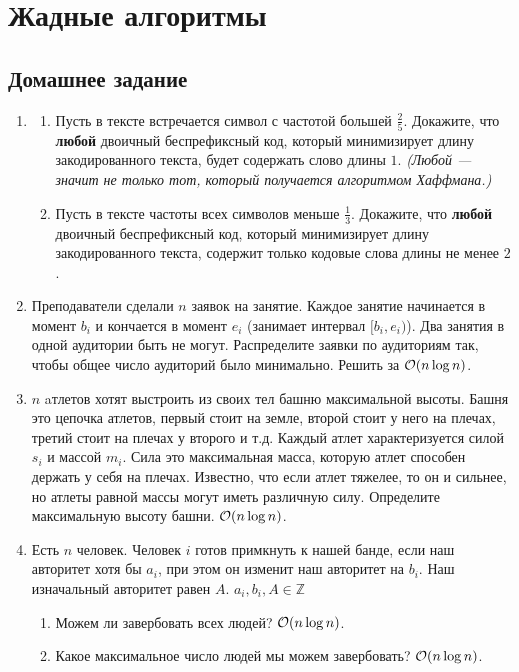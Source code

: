 \section{Жадные алгоритмы}

\subsection{Домашнее задание}
\begin{enumerate}
  \item
    \begin{enumerate}
      \item
        Пусть в тексте встречается символ с частотой большей $\frac{2}{5}$.
        Докажите, что \textbf{любой} двоичный беспрефиксный код, который минимизирует длину закодированного текста,
        будет содержать слово длины $1$. \textit{(Любой --- значит не только тот, который получается
        алгоритмом Хаффмана.)}

      \item
        Пусть в тексте частоты всех символов меньше $\frac{1}{3}$.
        Докажите, что \textbf{любой} двоичный беспрефиксный код, который минимизирует длину закодированного текста,
        содержит только кодовые слова длины не менее $2$.
    \end{enumerate}

  \item
 	Преподаватели сделали $n$ заявок на занятие. Каждое
 	занятие начинается в момент $b_i$ и кончается в момент $e_i$
 	(занимает интервал $[b_i, e_i)$). Два занятия в одной аудитории
 	быть не могут. Распределите заявки по аудиториям так, чтобы
 	общее число аудиторий было минимально. Решить за $\mathcal{O}(n \log n)$.

  \item
    $n$ aтлетов хотят выстроить из своих тел башню максимальной
    высоты. Башня это цепочка атлетов, первый стоит на земле, второй
    стоит у него на плечах, третий стоит на плечах у второго и
    т.д. Каждый атлет характеризуется силой $s_i$ и массой $m_i$. Сила
    это максимальная масса, которую атлет способен держать у себя на
    плечах. Известно, что если атлет тяжелее, то он и сильнее, но
    атлеты равной массы могут иметь различную силу. Определите
    максимальную высоту башни. $\mathcal{O}(n \log n)$.

  \item
	Есть $n$ человек. Человек $i$ готов примкнуть к нашей банде, если наш авторитет
	хотя бы $a_i$, при этом он изменит наш авторитет на $b_i$. Наш изначальный авторитет
	равен $A$. $a_i, b_i, A \in \mathbb{Z}$
	\begin{enumerate}
		\item Можем ли завербовать всех людей? $\mathcal{O}(n \log n)$.
		\item Какое максимальное число людей мы можем завербовать? $\mathcal{O}(n \log n)$.
	\end{enumerate}


\end{enumerate}
